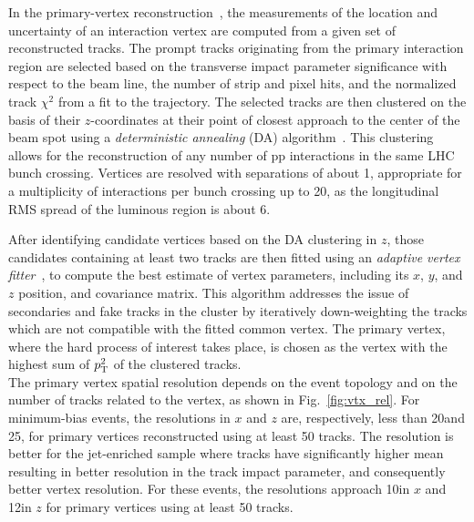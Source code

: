 In the primary-vertex reconstruction~\cite{Speer:927395}, the measurements of the location and uncertainty of an interaction vertex are computed from a given set of reconstructed tracks. The prompt tracks originating from the primary interaction region are selected based on the transverse impact parameter significance with respect to the beam line, the number of strip and pixel hits, and the normalized track $\chi^2$ from a fit to the trajectory. The selected tracks are then clustered on the basis of their $z$-coordinates at their point of closest approach to the center of the beam spot using a \textit{deterministic annealing} (DA) algorithm~\cite{726788}.
This clustering allows for the reconstruction of any number of pp interactions in the same LHC bunch crossing. Vertices are resolved with separations of about 1\mm, appropriate for a multiplicity of interactions per bunch crossing up to 20, as the longitudinal RMS spread of the luminous region is about 6\cm.

After identifying candidate vertices based on the DA clustering in $z$, those candidates containing at least two tracks are then fitted using an \textit{adaptive vertex fitter}~\cite{0954-3899-34-12-N01}, to compute the best
estimate of vertex parameters, including its $x$, $y$, and $z$ position, and covariance matrix. This algorithm addresses the issue of secondaries and fake tracks in the cluster by iteratively down-weighting the tracks which are not compatible with the fitted common vertex. The primary vertex, where the hard process of interest takes place, is chosen as the vertex with the highest sum of $p_{\mathrm{T}}^2$ of the clustered tracks.\\

The primary vertex spatial resolution depends on the event topology and on the number of tracks related to the vertex, as shown in Fig.~\ref{fig:vtx_rel}. For minimum-bias events, the resolutions in $x$ and $z$ are, respectively, less than 20\mum and 25\mum, for primary vertices reconstructed using at least 50 tracks. The resolution is better for the jet-enriched sample where tracks have significantly higher mean \pt resulting in better resolution in the track impact parameter, and consequently better vertex resolution. For these events, the resolutions approach 10\mum in $x$ and 12\mum in $z$ for primary vertices using at least 50 tracks.\\

